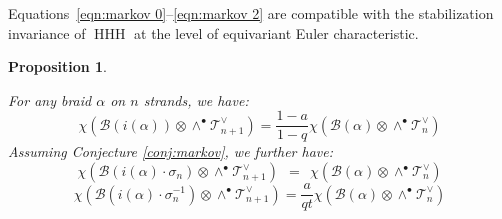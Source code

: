 \documentclass[12pt]{amsart}
\numberwithin{equation}{section}
\newtheorem{proposition}[theorem]{Proposition}
\theoremstyle{definition}
\theoremstyle{remark}
\DeclareMathOperator{\HHH}{HHH}
\newcommand{\CB}{\mathcal{B}}
\newcommand{\CT}{\mathcal{T}}
\renewcommand{\1}{\mathbf{1}}
\newcommand{\FH}{\mathrm{FHilb}}
\newcommand{\edg}{\emph{dg}}
\begin{document}
Equations~\eqref{eqn:markov 0}--\eqref{eqn:markov 2} are compatible with the stabilization invariance of \(\HHH\) at the level of equivariant Euler characteristic. 
\begin{proposition}
\label{prop:markov integrals}

For any braid $\alpha$ on $n$ strands, we have:
\begin{equation}
\label{eqn:markov int 0}
\chi \left( 
\CB(i(\alpha)) \otimes \wedge^\bullet \CT_{n+1}^\vee  \right) = \frac {1-a}{1-q} \chi \left( 
 \CB(\alpha) \otimes \wedge^\bullet \CT_n^\vee \right)
\end{equation}
Assuming Conjecture \ref{conj:markov}, we further have:
\begin{equation}
\label{eqn:markov int 1}
\chi \left( 
\CB(i(\alpha) \cdot \sigma_n) \otimes \wedge^\bullet \CT_{n+1}^\vee \right)\ \ = \ \ \chi \left(
  \CB(\alpha) \otimes \wedge^\bullet \CT_n^\vee \right)
 \end{equation}
\begin{equation}
\label{eqn:markov int 2}
\chi \left(
  \CB(i(\alpha) \cdot \sigma^{-1}_n) \otimes \wedge^\bullet \CT_{n+1}^\vee \right) =  \frac a{qt} \chi \left( 
   \CB(\alpha) \otimes \wedge^\bullet \CT_n^\vee \right)
\end{equation}
\end{proposition}
\end{document}
